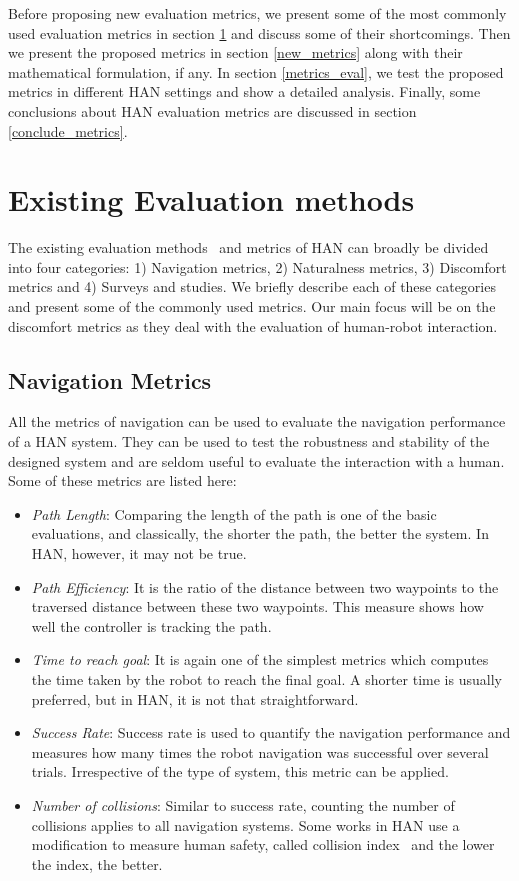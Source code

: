 Before proposing new evaluation metrics, we present some of the most commonly used evaluation metrics in section \ref{ex_metrics} and discuss some of their shortcomings. Then we present the proposed metrics in section \ref{new_metrics} along with their mathematical formulation, if any. In section \ref{metrics_eval}, we test the proposed metrics in different HAN settings and show a detailed analysis. Finally, some conclusions about HAN evaluation metrics are discussed in section \ref{conclude_metrics}.

\section{Existing Evaluation methods}\label{ex_metrics}
The existing evaluation methods~\cite{gao2021evaluation} and metrics of HAN can broadly be divided into four categories: 1) Navigation metrics, 2) Naturalness metrics, 3) Discomfort metrics and 4) Surveys and studies. We briefly describe each of these categories and present some of the commonly used metrics. Our main focus will be on the discomfort metrics as they deal with the evaluation of human-robot interaction.

\subsection{Navigation Metrics}
All the metrics of navigation can be used to evaluate the navigation performance of a HAN system. They can be used to test the robustness and stability of the designed system and are seldom useful to evaluate the interaction with a human. Some of these metrics are listed here:
\begin{itemize}
    \item \textit{Path Length}: Comparing the length of the path is one of the basic evaluations, and classically, the shorter the path, the better the system. In HAN, however, it may not be true.
    \item \textit{Path Efficiency}: It is the ratio of the distance between two waypoints to the traversed distance between these two waypoints. This measure shows how well the controller is tracking the path.
    \item \textit{Time to reach goal}: It is again one of the simplest metrics which computes the time taken by the robot to reach the final goal. A shorter time is usually preferred, but in HAN, it is not that straightforward. 
    \item \textit{Success Rate}: Success rate is used to quantify the navigation performance and measures how many times the robot navigation was successful over several trials. Irrespective of the type of system, this metric can be applied.
    \item \textit{Number of collisions}: Similar to success rate, counting the number of collisions applies to all navigation systems. Some works in HAN use a modification to measure human safety, called collision index~\cite{truong2014dynamic} and the lower the index, the better.
\end{itemize}

